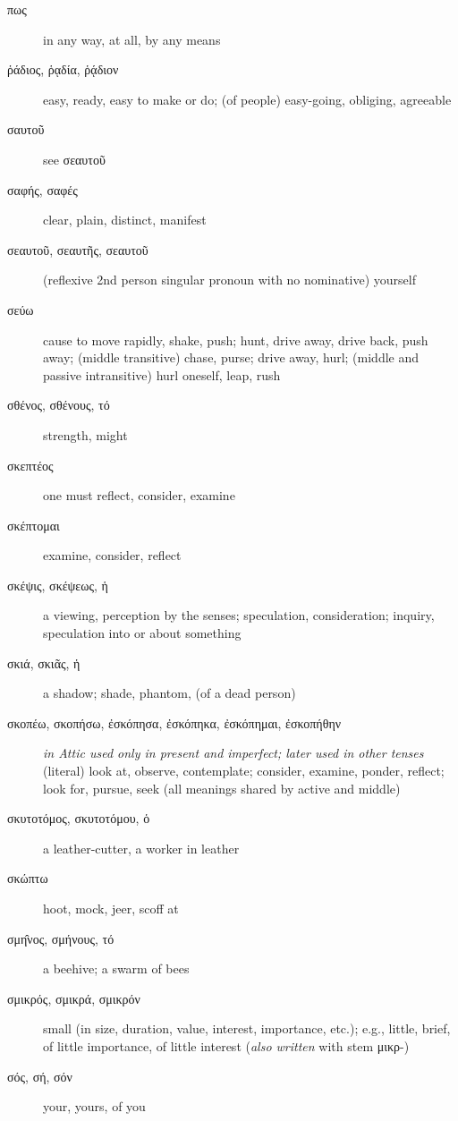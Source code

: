 \documentclass[12pt,letterpaper]{article}
\begin{document}
\begin{description}
    \item[\textgreek{πως}] \marginnote{*}in any way, at all, by any means
    \item[\textgreek{ῥάδιος, ῥᾳδία, ῥᾴδιον}] \marginnote{*}easy, ready, easy to make or do; (of people) easy-going, obliging, agreeable
    \item[\textgreek{σαυτοῦ}] see σεαυτοῦ
    \item[\textgreek{σαφής, σαφές}] \marginnote{*}clear, plain, distinct, manifest
    \item[\textgreek{σεαυτοῦ, σεαυτῆς, σεαυτοῦ}] (reflexive 2nd person singular pronoun with no nominative) yourself
    \item[\textgreek{σεύω}] cause to move rapidly, shake, push; hunt, drive away, drive back, push away; (middle transitive) chase, purse; drive away, hurl; (middle and passive intransitive) hurl oneself, leap, rush
    \item[\textgreek{σθένος, σθένους, τό}] strength, might
    \item[\textgreek{σκεπτέος}] one must reflect, consider, examine
    \item[\textgreek{σκέπτομαι}] examine, consider, reflect
    \item[\textgreek{σκέψις, σκέψεως, ἡ}] a viewing, perception by the senses; speculation, consideration; inquiry, speculation into or about something
    \item[\textgreek{σκιά, σκιᾶς, ἡ}] a shadow; shade, phantom,  (of a dead person)
    \item[\textgreek{σκοπέω, σκοπήσω, ἐσκόπησα, ἐσκόπηκα, ἐσκόπημαι, ἐσκοπήθην}] \marginnote{*}\textit{in Attic used only in present and imperfect; later used in other tenses} (literal) look at, observe, contemplate; consider, examine, ponder, reflect; look for, pursue, seek (all meanings shared by active and middle)
    \item[\textgreek{σκυτοτόμος, σκυτοτόμου, ὁ}] a leather-cutter, a worker in leather
    \item[\textgreek{σκώπτω}] hoot, mock, jeer, scoff at
    \item[\textgreek{σμη̂νος, σμήνους, τό}] a beehive; a swarm of bees
    \item[\textgreek{σμικρός, σμικρά, σμικρόν}] \marginnote{*} small (in size, duration, value, interest, importance, etc.); e.g., little, brief, of little importance, of little interest (\textit{also written} with stem \textgreek{μικρ}-)
    \item[\textgreek{σός, σή, σόν}] \marginnote{*}your, yours, of you

\end{description}
\end{document}
